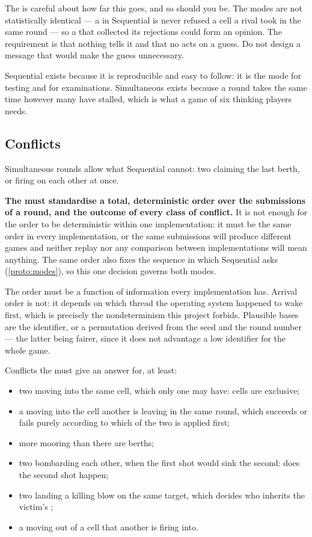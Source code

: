 \documentclass{article}
\begin{document}
The \MD{} is careful about how far this goes, and so should you be. The modes are not
statistically identical --- a \ship{} in Sequential is never refused a cell a rival took in the
same round --- so a \ship{} that collected its rejections could form an opinion. The requirement
is that nothing tells it and that no \ship{} acts on a guess. Do not design a message that would
make the guess unnecessary.

Sequential exists because it is reproducible and easy to follow: it is the mode for testing and for
examinations. Simultaneous exists because a round takes the same time however many \ships have
stalled, which is what a game of six thinking players needs.

\subsection{Conflicts}
\label{proto:conflicts}

Simultaneous rounds allow what Sequential cannot: two \ships claiming the last berth, or firing on
each other at once.

\textbf{The \WG{} must standardise a total, deterministic order over the submissions of a round,
and the outcome of every class of conflict.} It is not enough for the order to be deterministic
within one implementation: it must be the same order in every implementation, or the same
submissions will produce different games and neither replay nor any comparison between
implementations will mean anything. The same order also fixes the sequence in which Sequential
asks (\cref{proto:modes}), so this one decision governs both modes.

The order must be a function of information every implementation has. Arrival order is not: it
depends on which thread the operating system happened to wake first, which is precisely the
nondeterminism this project forbids. Plausible bases are the \ship{} identifier, or a permutation
derived from the seed and the round number --- the latter being fairer, since it does not advantage
a low identifier for the whole game.

Conflicts the \WG{} must give an answer for, at least:

\begin{itemize}
    \item two \ships moving into the same cell, which only one may have: cells are exclusive;
    \item a \ship{} moving into the cell another \ship{} is leaving in the same round, which
      succeeds or fails purely according to which of the two is applied first;
    \item more \ships mooring than there are berths;
    \item two \ships bombarding each other, when the first shot would sink the second: does the
      second shot happen;
    \item two \ships landing a killing blow on the same target, which decides who inherits the
      victim's \clues{};
    \item a \ship{} moving out of a cell that another \ship{} is firing into.
\end{itemize}
\end{document}
